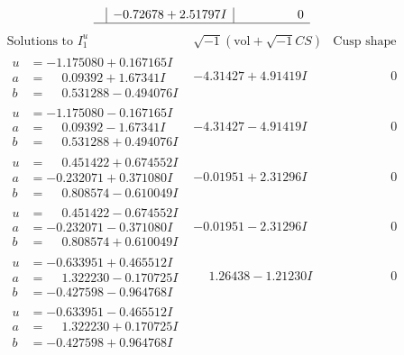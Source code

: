 \documentclass[1p]{elsarticle_modified}
\theoremstyle{definition}
\newcommand{\I}{\sqrt{-1}}
\begin{document}
$$\begin{array}{c|c|c}
 & -0.72678 + 2.51797 I & \phantom{-0.000000 } 0\\
 \hline 
 \end{array}$$\newpage$$\begin{array}{c|c|c}  
\text{Solutions to }I^u_{1}& \I (\text{vol} + \sqrt{-1}CS) & \text{Cusp shape}\\
 \hline 
\begin{aligned}
u &= -1.175080 + 0.167165 I \\
a &= \phantom{-}0.09392 + 1.67341 I \\
b &= \phantom{-}0.531288 - 0.494076 I\end{aligned}
 & -4.31427 + 4.91419 I & \phantom{-0.000000 } 0 \\ \hline\begin{aligned}
u &= -1.175080 - 0.167165 I \\
a &= \phantom{-}0.09392 - 1.67341 I \\
b &= \phantom{-}0.531288 + 0.494076 I\end{aligned}
 & -4.31427 - 4.91419 I & \phantom{-0.000000 } 0 \\ \hline\begin{aligned}
u &= \phantom{-}0.451422 + 0.674552 I \\
a &= -0.232071 + 0.371080 I \\
b &= \phantom{-}0.808574 - 0.610049 I\end{aligned}
 & -0.01951 + 2.31296 I & \phantom{-0.000000 } 0 \\ \hline\begin{aligned}
u &= \phantom{-}0.451422 - 0.674552 I \\
a &= -0.232071 - 0.371080 I \\
b &= \phantom{-}0.808574 + 0.610049 I\end{aligned}
 & -0.01951 - 2.31296 I & \phantom{-0.000000 } 0 \\ \hline\begin{aligned}
u &= -0.633951 + 0.465512 I \\
a &= \phantom{-}1.322230 - 0.170725 I \\
b &= -0.427598 - 0.964768 I\end{aligned}
 & \phantom{-}1.26438 - 1.21230 I & \phantom{-0.000000 } 0 \\ \hline\begin{aligned}
u &= -0.633951 - 0.465512 I \\
a &= \phantom{-}1.322230 + 0.170725 I \\
b &= -0.427598 + 0.964768 I\end{aligned}

\end{array}$$
\end{document}
